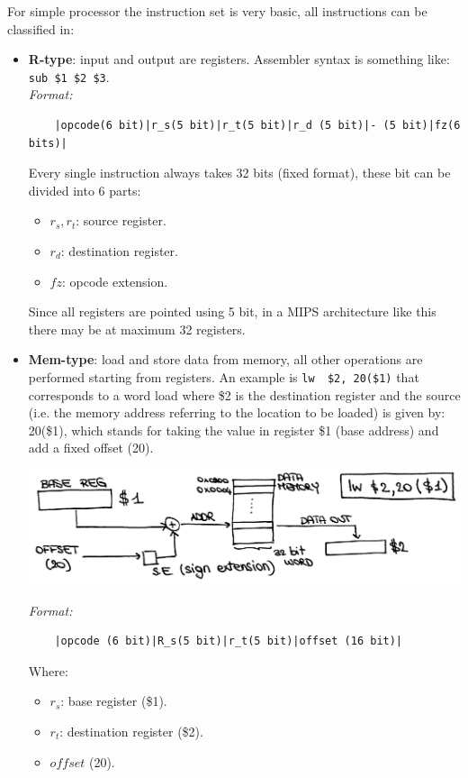 For simple processor the instruction set is very basic, all instructions can be
classified in:
\begin{itemize}

  \item \textbf{R-type}: input and output are registers. Assembler syntax is
    something like: \verb|sub $1 $2 $3|.\\
    \textit{Format:}

    \begin{verbatim}
    |opcode(6 bit)|r_s(5 bit)|r_t(5 bit)|r_d (5 bit)|- (5 bit)|fz(6 bits)|
    \end{verbatim}
    Every single instruction always takes 32 bits (fixed format), these bit can
    be divided into 6 parts:

    \begin{itemize}
    \item $r_s, r_t$: source register.
    \item $r_d$: destination register.
    \item $fz$: opcode extension.
    \end{itemize}

    Since all registers are pointed using 5 bit, in a MIPS architecture like
    this there may be at maximum 32 registers.

  \item \textbf{Mem-type}: load and store data from memory, all other operations
    are performed starting from registers.
    An example is \verb|lw  $2, 20($1)| that corresponds to a word load where
    \$2 is the destination register and the source (i.e. the memory address
    referring to the location to be loaded) is given by: 20(\$1), which stands
    for taking the value in register \$1 (base address) and add a fixed
    offset (20).
    \begin{center}
      \includegraphics[width=0.8\linewidth]{img/img3/1}
    \end{center}

    \textit{Format:}
    \begin{verbatim}
    |opcode (6 bit)|R_s(5 bit)|r_t(5 bit)|offset (16 bit)|
    \end{verbatim}
    Where:
    \begin{itemize}
      \item $r_s$: base register (\$1).
      \item $r_t$: destination register (\$2).
      \item $offset$ (20).
    \end{itemize}


\end{itemize}

